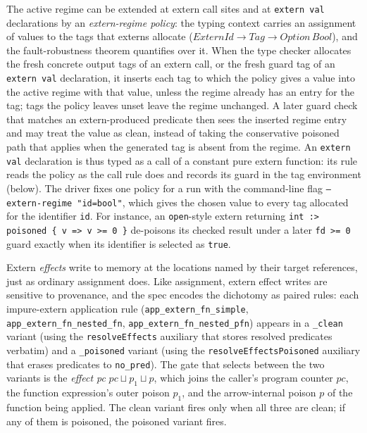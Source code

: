 \documentclass[12pt]{article}
\begin{document}
The active regime can be extended at extern call sites and at
\texttt{extern val} declarations by an \emph{extern-regime policy}: the typing
context carries an assignment of values to the tags that externs allocate
(\(\mathit{ExternId} \to \mathit{Tag} \to \mathit{Option}\,\mathit{Bool}\)),
and the fault-robustness theorem quantifies over it. When the type checker
allocates the fresh concrete output tags of an extern call, or the fresh guard
tag of an \texttt{extern val} declaration, it inserts each tag to which the
policy gives a value into the active regime with that value, unless the regime
already has an entry for the tag; tags the policy leaves unset leave the regime
unchanged. A later guard check that matches an extern-produced predicate then
sees the inserted regime entry and may treat the value as clean, instead of
taking the conservative poisoned path that applies when the generated tag is
absent from the regime. An \texttt{extern val} declaration is thus typed as a
call of a constant pure extern function: its rule reads the policy as the call
rule does and records its guard in the tag environment (below). The driver
fixes one policy for a run with the command-line flag
\texttt{--extern-regime "id=bool"}, which gives the chosen value to every tag
allocated for the identifier \texttt{id}. For instance, an \texttt{open}-style extern returning
\texttt{int :> poisoned \{ v => v >= 0 \}} de-poisons its checked result under a
later \texttt{fd >= 0} guard exactly when its identifier is selected as
\texttt{true}.

Extern \emph{effects} write to memory at the locations named by their target
references, just as ordinary assignment does. Like assignment, extern effect
writes are sensitive to provenance, and the spec encodes the dichotomy as
paired rules: each impure-extern application rule
(\texttt{app\_extern\_fn\_simple}, \texttt{app\_extern\_fn\_nested\_fn},
\texttt{app\_extern\_fn\_nested\_pfn}) appears in a \texttt{\_clean} variant
(using the \texttt{resolveEffects} auxiliary that stores resolved predicates
verbatim) and a \texttt{\_poisoned} variant (using the
\texttt{resolveEffectsPoisoned} auxiliary that erases predicates to
\texttt{no\_pred}). The gate that selects between the two variants is the
\emph{effect pc} \(\textit{pc} \sqcup p_1 \sqcup p\), which joins the
caller's program counter \(\textit{pc}\), the function expression's outer
poison \(p_1\), and the arrow-internal poison \(p\) of the function being
applied. The clean variant fires only when all three are clean; if any of
them is poisoned, the poisoned variant fires.
\end{document}
